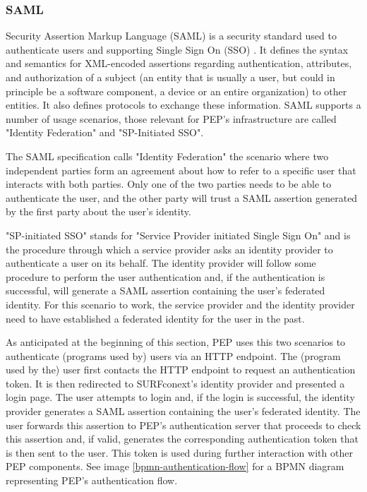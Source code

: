 \documentclass{report}
\begin{document}
\subsubsection{SAML}
Security Assertion Markup Language (SAML) is a security standard used to authenticate users and supporting Single Sign On (SSO) \cite{sstc-saml-core-errata-2.0-wd-07}. It defines
the syntax and semantics for XML-encoded assertions regarding authentication, attributes, and authorization of a subject (an entity that is usually a user, but could in principle
be a software component, a device or an entire organization) to other entities. It also defines protocols to exchange these information. SAML supports a number of usage scenarios, those 
relevant for PEP's infrastructure are called "Identity Federation" and "SP-Initiated SSO". \par
The SAML specification calls "Identity Federation" the scenario where two independent parties form an agreement about how to refer to a specific user that interacts with both
parties. Only one of the two parties needs to be able to authenticate the user, and the other party will trust a SAML assertion generated by the first party about the user's identity. \par
"SP-initiated SSO" stands for "Service Provider initiated Single Sign On" and is the procedure through which a service provider asks an identity provider to authenticate a user on
its behalf. The identity provider will follow some procedure to perform the user authentication and, if the authentication is successful, will generate a SAML assertion containing
the user's federated identity. For this scenario to work, the service provider and the identity provider need to have established a federated identity for the user in the past.\par
As anticipated at the beginning of this section, PEP uses this two scenarios to authenticate (programs used by) users via an HTTP endpoint. The (program used by the) user first contacts 
the HTTP endpoint to request an authentication token. It is then redirected to SURFconext's identity provider and presented a login page. The user attempts to login and, if the login is 
successful, the identity provider generates a SAML assertion containing the user's federated identity. The user forwards this assertion to PEP's authentication server that proceeds to 
check this assertion and, if valid, generates the corresponding authentication token that is then sent to the user. This token is used during further interaction with other PEP 
components. See image \ref{bpmn-authentication-flow} for a BPMN diagram representing PEP's authentication flow.
\end{document}
